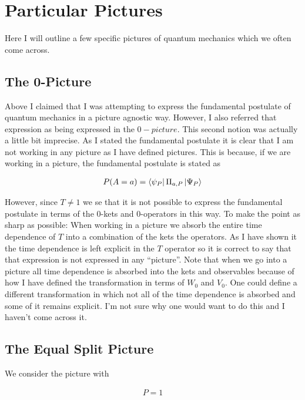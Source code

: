 \documentclass[12pt]{article}
\begin{document}
\section{Particular Pictures}

Here I will outline a few specific pictures of quantum mechanics which we often come across.

\subsection{The 0-Picture}

Above I claimed that I was attempting to express the fundamental postulate of quantum mechanics in a picture agnostic way. However, I also referred that expression as being expressed in the $0-picture$. This second notion was actually a little bit imprecise. As I stated the fundamental postulate it is clear that I am not working in any picture as I have defined pictures. This is because, if we are working in a picture, the fundamental postulate is stated as

\begin{align}
P(A=a) = \bra{\psi_P}\Pi_{a,P} \ket{\Psi_P}
\end{align}

However, since $T \neq 1$ we se that it is not possible to express the fundamental postulate in terms of the 0-kets and 0-operators in this way. To make the point as sharp as possible: When working in a picture we absorb the entire time dependence of $T$ into a combination of the kets the operators. As I have shown it the time dependence is left explicit in the $T$ operator so it is correct to say that that expression is not expressed in any ``picture''. Note that when we go into a picture all time dependence is absorbed into the kets and observables because of how I have defined the transformation in terms of $W_0$ and $V_0$. One could define a different transformation in which not all of the time dependence is absorbed and some of it remains explicit. I'm not sure why one would want to do this and I haven't come across it.

\subsection{The Equal Split Picture}

We consider the picture with

\begin{align}
P = 1
\end{align}
\end{document}
